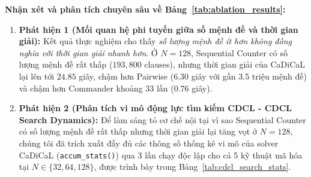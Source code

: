 \documentclass[11pt,a4paper]{article}
\begin{document}
\textbf{Nhận xét và phân tích chuyên sâu về Bảng~\ref{tab:ablation_results}:}
\begin{enumerate}
    \item \textbf{Phát hiện 1 (Mối quan hệ phi tuyến giữa số mệnh đề và thời gian giải):} Kết quả thực nghiệm cho thấy \textit{số lượng mệnh đề ít hơn không đồng nghĩa với thời gian giải nhanh hơn}. Ở $N=128$, Sequential Counter có số lượng mệnh đề rất thấp ($193{,}800$ clauses), nhưng thời gian giải của CaDiCaL lại lên tới $24.85$ giây, chậm hơn Pairwise ($6.30$ giây với gần 3.5 triệu mệnh đề) và chậm hơn Commander khoảng 33 lần ($0.76$ giây).
    \item \textbf{Phát hiện 2 (Phân tích vi mô động lực tìm kiếm CDCL - CDCL Search Dynamics):} 
    Để làm sáng tỏ cơ chế nội tại vì sao Sequential Counter có số lượng mệnh đề rất thấp nhưng thời gian giải lại tăng vọt ở $N=128$, chúng tôi đã trích xuất đầy đủ các thông số thống kê vi mô của solver CaDiCaL (\texttt{accum\_stats()}) qua 3 lần chạy độc lập cho cả 5 kỹ thuật mã hóa tại $N \in \{32, 64, 128\}$, được trình bày trong Bảng~\ref{tab:cdcl_search_stats}.


\end{enumerate}
\end{document}
